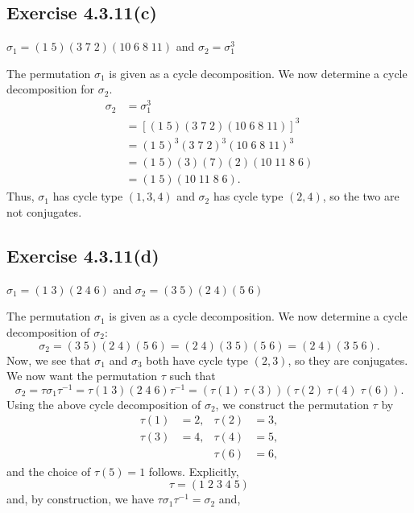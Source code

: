\documentclass[12pt]{article}
\newenvironment{problem}
    {\begin{lrbox}{\mybox}\begin{minipage}{0.98\textwidth}}
    {\end{minipage}\end{lrbox}\framebox[\textwidth]{\usebox{\mybox}}}
\newcommand{\<}{\left\langle} %
\renewcommand{\>}{\right\rangle} %
\begin{document}
\subsection*{Exercise 4.3.11(c)}
\begin{problem}
    $\sigma_1 = (1\;5)(3\;7\;2)(10\;6\;8\;11)$ and $\sigma_2 = \sigma_1^3$
\end{problem}
\medskip

The permutation $\sigma_1$ is given as a cycle decomposition. We now determine a cycle decomposition for $\sigma_2$.
\begin{align*}
    \sigma_2
        &= \sigma_1^3 \\
        &= [(1\;5)(3\;7\;2)(10\;6\;8\;11)]^3 \\
        &= (1\;5)^3(3\;7\;2)^3(10\;6\;8\;11)^3 \\
        &= (1\;5)(3)(7)(2)(10\;11\;8\;6) \\
        &= (1\;5)(10\;11\;8\;6).
\end{align*}
Thus, $\sigma_1$ has cycle type $(1,3,4)$ and $\sigma_2$ has cycle type $(2,4)$, so the two are not conjugates.

\subsection*{Exercise 4.3.11(d)}
\begin{problem}
    $\sigma_1 = (1\;3)(2\;4\;6)$ and $\sigma_2 = (3\;5)(2\;4)(5\;6)$
\end{problem}
\medskip

The permutation $\sigma_1$ is given as a cycle decomposition. We now determine a cycle decomposition of $\sigma_2$:
\[\sigma_2 = (3\;5)(2\;4)(5\;6) = (2\;4)(3\;5)(5\;6) = (2\;4)(3\;5\;6).\]
Now, we see that $\sigma_1$ and $\sigma_3$ both have cycle type $(2,3)$, so they are conjugates. We now want the permutation $\tau$ such that
\[\sigma_2 = \tau\sigma_1\tau^{-1} = \tau(1\;3)(2\;4\;6)\tau^{-1} = (\tau(1)\;\tau(3))(\tau(2)\;\tau(4)\;\tau(6)).\]
Using the above cycle decomposition of $\sigma_2$, we construct the permutation $\tau$ by
\begin{align*}
    \tau(1) &= 2, & \tau(2) &= 3, \\
    \tau(3) &= 4, & \tau(4) &= 5, \\
     & & \tau(6) &= 6,
\end{align*}
and the choice of $\tau(5) = 1$ follows. Explicitly,
\[\tau = (1\;2\;3\;4\;5)\]
and, by construction, we have $\tau\sigma_1\tau^{-1} = \sigma_2$ and, 
\end{document}
